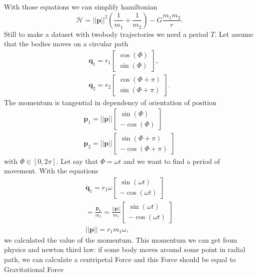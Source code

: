 With those equations we can simplify hamiltonian \begin{equation}
	\mathcal{H}= ||\mathbf{p}||^2\left(\frac{1}{m_1}+\frac{1}{m_2}\right) - G\frac{m_1m_2}{r}.
\end{equation}
Still to make a dataset with twobody trajectories we need a period $T$. Let assume that the bodies moves on a circular path
\begin{eqnarray}
	\mathbf{q}_1 = r_1
	\begin{bmatrix}
		\cos(\Phi)\\
		\sin(\Phi)
	\end{bmatrix},\\
\mathbf{q}_2 = r_2
\begin{bmatrix}
	\cos(\Phi+ \pi)\\
	\sin(\Phi+ \pi)
\end{bmatrix}.
\end{eqnarray}
The momentum is tangential in dependency of orientation of position
\begin{eqnarray}
	\mathbf{p}_1 = ||\mathbf{p}||
	\begin{bmatrix}
		\sin(\Phi)\\
		-\cos(\Phi)
	\end{bmatrix}\\
	\mathbf{p}_2 = ||\mathbf{p}||
	\begin{bmatrix}
		\sin(\Phi+ \pi)\\
		-\cos(\Phi+ \pi)
	\end{bmatrix}
\end{eqnarray} with $\Phi \in [0,2\pi] $.
Let say that $\Phi=\omega t$
and we want to find a period of movement.
With the equations
\begin{eqnarray}
	\dot{\mathbf{q}}_1 = r_1\omega
	\begin{bmatrix}
		\sin(\omega t)\\
		-\cos(\omega t)
	\end{bmatrix}\\ = \frac{\mathbf{p_1}}{m_1} = \frac{||\mathbf{p}||}{m_1}\begin{bmatrix}
	\sin(\omega t)\\
	-\cos(\omega t)
\end{bmatrix}\\
||\mathbf{p}|| = r_1m_1\omega,
\end{eqnarray}
we calculated the value of the momentum.
This momentum we can get from physics and newton third law: if some body moves around some point in radial path, we can calculate a centripetal Force and this Force should be equal to Gravitational Force
